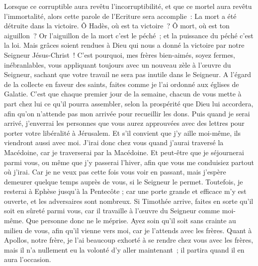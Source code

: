 \begin{multicols}{2}
Lorsque ce corruptible aura revêtu l'incorruptibilité, et que ce mortel aura revêtu l'immortalité, alors cette parole de l'Ecriture sera accomplie~: La mort a été détruite dans la victoire.
Ô Hadès, où est ta victoire~? Ô mort, où est ton aiguillon~?
Or l'aiguillon de la mort c'est le péché~; et la puissance du péché c'est la loi.
Mais grâces soient rendues à Dieu qui nous a donné la victoire par notre Seigneur Jésus-Christ~!
C'est pourquoi, mes frères bien-aimés, soyez fermes, inébranlables, vous appliquant toujours avec un nouveau zèle à l'œuvre du Seigneur, sachant que votre travail ne sera pas inutile dans le Seigneur.
\VerseOne{}A l'égard de la collecte en faveur des saints, faites comme je l'ai ordonné aux églises de Galatie.
C'est que chaque premier jour de la semaine, chacun de vous mette à part chez lui ce qu'il pourra assembler, selon la prospérité que Dieu lui accordera, afin qu'on n'attende pas mon arrivée pour recueillir les dons.
Puis quand je serai arrivé, j'enverrai les personnes que vous aurez approuvées avec des lettres pour porter votre libéralité à Jérusalem.
Et s'il convient que j'y aille moi-même, ils viendront aussi avec moi.
J'irai donc chez vous quand j'aurai traversé la Macédoine, car je traverserai par la Macédoine.
Et peut-être que je séjournerai parmi vous, ou même que j'y passerai l'hiver, afin que vous me conduisiez partout où j'irai.
Car je ne veux pas cette fois vous voir en passant, mais j'espère demeurer quelque temps auprès de vous, si le Seigneur le permet.
Toutefois, je resterai à Ephèse jusqu'à la Pentecôte ;
car une porte grande et efficace m'y est ouverte, et les adversaires sont nombreux.
Si Timothée arrive, faites en sorte qu'il soit en sûreté parmi vous, car il travaille à l'œuvre du Seigneur comme moi-même.
Que personne donc ne le méprise. Ayez soin qu'il soit sans crainte au milieu de vous, afin qu'il vienne vers moi, car je l'attends avec les frères.
Quant à Apollos, notre frère, je l'ai beaucoup exhorté à se rendre chez vous avec les frères, mais il n'a nullement eu la volonté d'y aller maintenant~; il partira quand il en aura l'occasion.

\end{multicols}
